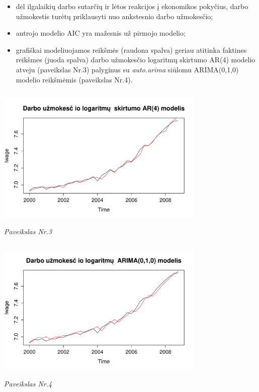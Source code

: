 \documentclass[12pt,a4paper]{article}
\theoremstyle{change}\newtheorem{salyga}{Uždavinys}
\begin{document}
\begin{itemize}
\item dėl ilgalaikių darbo sutarčių ir lėtos reakcijos į ekonomikos pokyčius, darbo užmokestis turėtų priklausyti nuo ankstesnio darbo užmokesčio;
\item antrojo  modelio AIC yra mažesnis už pirmojo modelio;
\item grafiškai modeliuojamos reikšmės (raudona spalva) geriau atitinka faktines reikšmes (juoda spalva) darbo užmokesčio logaritmų skirtumo AR(4) modelio atveju (paveikslas Nr.3) palyginus su \textit{auto.arima} siūlomu ARIMA(0,1,0) modelio reikšmėmis (paveikslas Nr.4).
\end{itemize}
\vskip 8pt   

\begin{center}
\includegraphics[width=100mm,height=70mm]{arlwage7}
\\ \textit{Paveikslas Nr.3}
\end{center}
\vskip 8pt     
\begin{center}
\includegraphics[width=100mm,height=70mm]{arlwage2}
\\ \textit{Paveikslas Nr.4}
\end{center}
\vskip 8pt        
     
\end{document}
